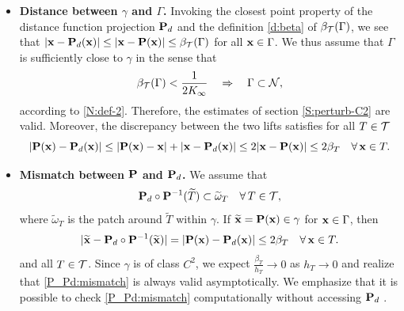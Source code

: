 \begin{itemize}
\item
{\bf Distance between $\gamma$ and $\Gamma$.}
Invoking the closest point property of the distance function projection
${\bf P}_d$ and the definition \eqref{d:beta} of $\beta_{\mathcal{T}}(\Gamma)$, we see that
$|{\bf x} - {\bf P}_d({\bf x})| \le |{\bf x} -{\bf P}({\bf x})| \le \beta_{\mathcal{T}}(\Gamma)$ for all ${\bf x}\in\Gamma$.
We thus assume that $\Gamma$ is sufficiently close to $\gamma$ in the sense that
%
\begin{equation}\label{beta-small}
\beta_{\mathcal{T}}(\Gamma) < \frac{1}{2 K_\infty}
\quad\Rightarrow\quad
\Gamma\subset\mathcal{N},
\end{equation}
%
according to \eqref{N:def-2}. Therefore, the estimates of section \ref{S:perturb-C2}
are valid. Moreover, the discrepancy between the two lifts satisfies for all $T\in\mathcal{T}$
%
\[
| {\bf P}({\bf x}) - {\bf P}_{d}({\bf x})| \leq | {\bf P}({\bf x}) - {\bf x}| + |{\bf x} -{\bf P}_{d}({\bf x})|
\leq 2 | {\bf x} -{\bf P}({\bf x})| \le 2 \beta_T
\quad\forall \,{\bf x}\in T.
\]
%

%
\item
{\bf Mismatch between ${\bf P}$ and ${\bf P}_d$.} We assume that
%
\begin{equation}\label{P_Pd:mismatch}
  {\bf P}_d \circ {\bf P}^{-1} (\widetilde{T}) \subset \widetilde{\omega}_T
  \quad\forall \, T \in \mathcal{T},
\end{equation}
%
where $\widetilde{\omega}_T$ is the patch around $\widetilde{T}$ within $\gamma$.
If $\widetilde{{\bf x}}={\bf P}({\bf x})\in\gamma$ for ${\bf x}\in\Gamma$, then
%
\begin{equation}\label{error-mismatch}
|\widetilde{{\bf x}} -  {\bf P}_d \circ {\bf P}^{-1}(\widetilde{{\bf x}})|
= |{\bf P}({\bf x}) - {\bf P}_d({\bf x})| \le 2 \beta_T
\quad\forall \, {\bf x}\in T.
\end{equation}
%
and all $T\in\mathcal{T}$. Since $\gamma$ is of class $C^2$, we expect $\frac{\beta_T}{h_T}\to0$
as $h_T\to0$ and realize that \eqref{P_Pd:mismatch} is always valid asymptotically.
We emphasize that it is possible to check \eqref{P_Pd:mismatch} computationally
without accessing ${\bf P}_d$ \cite{BD:18}.



\end{itemize}

